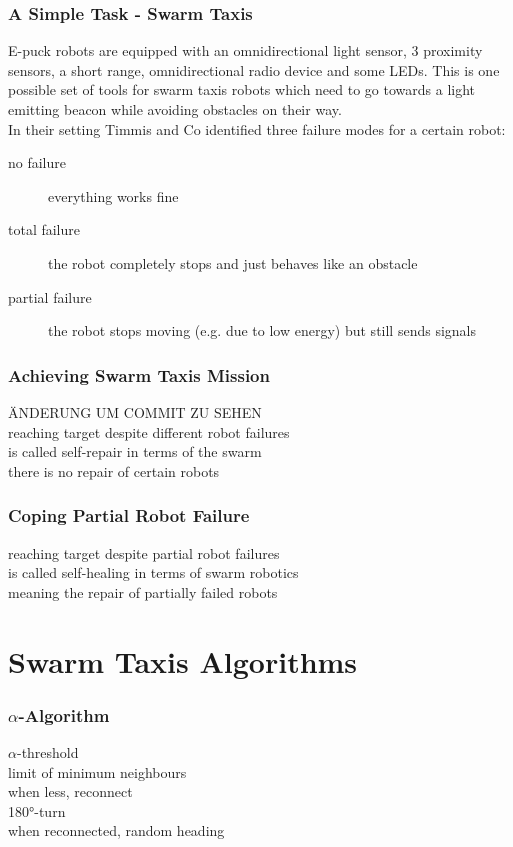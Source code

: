 \documentclass[
	a4paper,
	article,
	pagesize,
	pdftex,
	12pt,
	english,
	fleqn,
	final,
	]{scrartcl}
\begin{document}
\subsubsection{A Simple Task - Swarm Taxis}
E-puck robots are equipped with an omnidirectional light sensor, 3 proximity sensors, a short range, omnidirectional radio device and some LEDs.
This is one possible set of tools for swarm taxis robots which need to go towards a light emitting beacon while avoiding obstacles on their way.\\

In their setting Timmis and Co identified three failure modes for a certain robot:
\begin{description}
	\item[no failure]
		everything works fine
	\item[total failure] the robot completely stops and just behaves like an obstacle
	\item[partial failure] the robot stops moving (e.g. due to low energy) but still sends signals
\end{description} 

\subsubsection{Achieving Swarm Taxis Mission}

\color{red}
ÄNDERUNG UM COMMIT ZU SEHEN\\
reaching target despite different robot failures\\
is called self-repair in terms of the swarm\\
there is no repair of certain robots

\subsubsection{Coping Partial Robot Failure}
reaching target despite partial robot failures\\
is called self-healing in terms of swarm robotics\\
meaning the repair of partially failed robots

\section{Swarm Taxis Algorithms}

\subsubsection{$\alpha$-Algorithm}
$\alpha$-threshold\\
limit of minimum neighbours\\
when less, reconnect\\
180°-turn\\
when reconnected, random heading
\end{document}
